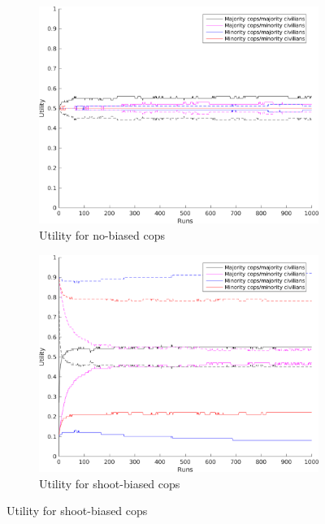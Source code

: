 \begin{figure}[H]

\centering
\begin{subfigure}[b]{0.62\textwidth}
        \includegraphics[width=\textwidth]{./pictures/Utility05NoBias.png}
        \caption{Utility for no-biased cops}
        \label{fig:utNoBias}
    \end{subfigure}
    \begin{subfigure}[b]{0.62\textwidth}
        \includegraphics[width=\textwidth]{./pictures/Utility05Shoot}
        \caption{Utility for shoot-biased cops}
        \label{fig:utShoot}
    \end{subfigure}

\end{figure}
